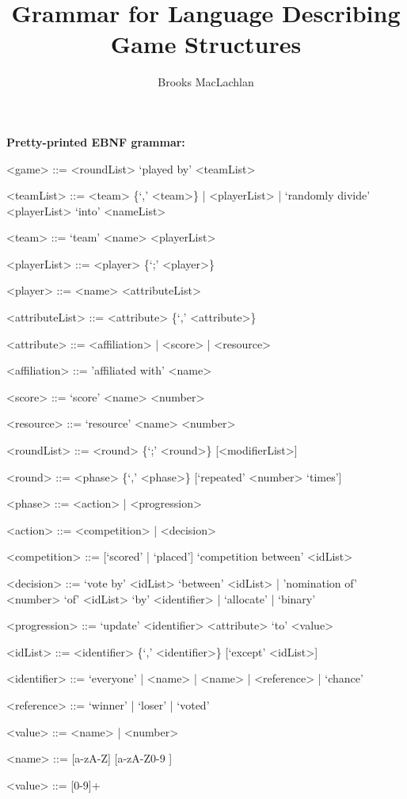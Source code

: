 \documentclass{article}
\title{Grammar for Language Describing Game Structures}
\author{Brooks MacLachlan}
\begin{document}
\maketitle

\noindent \textbf{Pretty-printed EBNF grammar:}
\begin{grammar}
<game> ::= <roundList> `played by' <teamList>

<teamList> ::= <team> \{`,' <team>\} | <playerList> | `randomly divide' 
<playerList> `into' <nameList>

<team> ::= `team' <name> <playerList>

<playerList> ::= <player> \{`;' <player>\}

<player> ::= <name> <attributeList> 

<attributeList> ::= <attribute> \{`,' <attribute>\}

<attribute> ::= <affiliation> | <score> | <resource>

<affiliation> ::= 'affiliated with' <name> 

<score> ::= `score' <name> <number> 

<resource> ::= `resource' <name> <number>

<roundList> ::= <round> \{`;' <round>\} [<modifierList>]

<round> ::= <phase> \{`,' <phase>\} [`repeated' <number> `times']

<phase> ::= <action> | <progression>

<action> ::= <competition> | <decision>

<competition> ::= [`scored' | `placed'] `competition between' <idList>

<decision> ::= `vote by' <idList> `between' <idList> | 'nomination of' <number> 
`of' <idList> `by' <identifier> | `allocate' | `binary' %

<progression> ::= `update' <identifier> <attribute> `to' <value>

<idList> ::= <identifier> \{`,' <identifier>\} [`except' <idList>]

<identifier> ::= `everyone' | <name> | <name> | <reference> | `chance' %

<reference> ::= `winner' | `loser' | `voted'

<value> ::= <name> | <number>

<name> ::= [a-zA-Z] {[a-zA-Z0-9 ]}

<value> ::= [0-9]+

\end{grammar}
\end{document}
